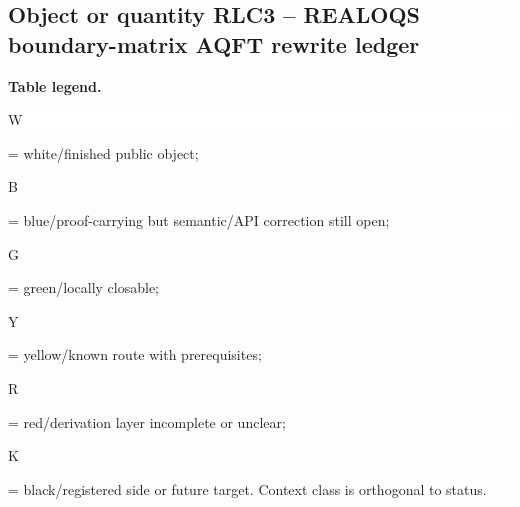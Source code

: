 \subsection*{Object or quantity RLC3 -- REALOQS boundary-matrix AQFT rewrite ledger}
\hypertarget{objproof:RLC3}{}
\par\smallskip\noindent\begin{minipage}{0.99\linewidth}\footnotesize\raggedright\textbf{Table legend.} \colorbox{white}{\strut W} = white/finished public object; \colorbox{cyan!20}{\strut B} = blue/proof-carrying but semantic/API correction still open; \colorbox{green!18}{\strut G} = green/locally closable; \colorbox{yellow!25}{\strut Y} = yellow/known route with prerequisites; \colorbox{red!20}{\strut R} = red/derivation layer incomplete or unclear; \colorbox{black!18}{\strut K} = black/registered side or future target. Context class is orthogonal to status.\end{minipage}\par\vspace{0.25em}
